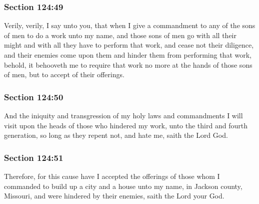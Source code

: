 	\subsubsection{Section 124:49} %
		\label{DC124-49}

		Verily, verily, I say unto you, that when I give a commandment to any of the sons of men to do a work unto my name, and those sons of men go with all their might and with all they have to perform that work, and cease not their diligence, and their enemies come upon them and hinder them from performing that work, behold, it behooveth me to require that work no more at the hands of those sons of men, but to accept of their offerings.


	\subsubsection{Section 124:50} %
		\label{DC124-50}

		And the iniquity and transgression of my holy laws and commandments I will visit upon the heads of those who hindered my work, unto the third and fourth generation, so long as they repent not, and hate me, saith the Lord God.


	\subsubsection{Section 124:51} %
		\label{DC124-51}

		Therefore, for this cause have I accepted the offerings of those whom I commanded to build up a city and a house unto my name, in Jackson county, Missouri, and were hindered by their enemies, saith the Lord your God.

